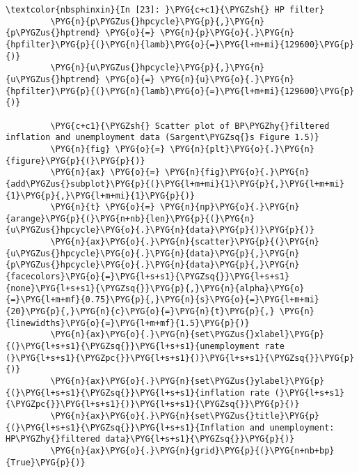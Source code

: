 \documentclass[letterpaper,10pt,openany,oneside,english]{sphinxmanual}
\begin{document}
\noindent{}

%
\begin{Verbatim}[commandchars=\\\{\}]
\textcolor{nbsphinxin}{In [23]: }\PYG{c+c1}{\PYGZsh{} HP filter}
         \PYG{n}{p\PYGZus{}hpcycle}\PYG{p}{,}\PYG{n}{p\PYGZus{}hptrend} \PYG{o}{=} \PYG{n}{p}\PYG{o}{.}\PYG{n}{hpfilter}\PYG{p}{(}\PYG{n}{lamb}\PYG{o}{=}\PYG{l+m+mi}{129600}\PYG{p}{)}
         \PYG{n}{u\PYGZus{}hpcycle}\PYG{p}{,}\PYG{n}{u\PYGZus{}hptrend} \PYG{o}{=} \PYG{n}{u}\PYG{o}{.}\PYG{n}{hpfilter}\PYG{p}{(}\PYG{n}{lamb}\PYG{o}{=}\PYG{l+m+mi}{129600}\PYG{p}{)}
         
         \PYG{c+c1}{\PYGZsh{} Scatter plot of BP\PYGZhy{}filtered inflation and unemployment data (Sargent\PYGZsq{}s Figure 1.5)}
         \PYG{n}{fig} \PYG{o}{=} \PYG{n}{plt}\PYG{o}{.}\PYG{n}{figure}\PYG{p}{(}\PYG{p}{)}
         \PYG{n}{ax} \PYG{o}{=} \PYG{n}{fig}\PYG{o}{.}\PYG{n}{add\PYGZus{}subplot}\PYG{p}{(}\PYG{l+m+mi}{1}\PYG{p}{,}\PYG{l+m+mi}{1}\PYG{p}{,}\PYG{l+m+mi}{1}\PYG{p}{)}
         \PYG{n}{t} \PYG{o}{=} \PYG{n}{np}\PYG{o}{.}\PYG{n}{arange}\PYG{p}{(}\PYG{n+nb}{len}\PYG{p}{(}\PYG{n}{u\PYGZus{}hpcycle}\PYG{o}{.}\PYG{n}{data}\PYG{p}{)}\PYG{p}{)}
         \PYG{n}{ax}\PYG{o}{.}\PYG{n}{scatter}\PYG{p}{(}\PYG{n}{u\PYGZus{}hpcycle}\PYG{o}{.}\PYG{n}{data}\PYG{p}{,}\PYG{n}{p\PYGZus{}hpcycle}\PYG{o}{.}\PYG{n}{data}\PYG{p}{,}\PYG{n}{facecolors}\PYG{o}{=}\PYG{l+s+s1}{\PYGZsq{}}\PYG{l+s+s1}{none}\PYG{l+s+s1}{\PYGZsq{}}\PYG{p}{,}\PYG{n}{alpha}\PYG{o}{=}\PYG{l+m+mf}{0.75}\PYG{p}{,}\PYG{n}{s}\PYG{o}{=}\PYG{l+m+mi}{20}\PYG{p}{,}\PYG{n}{c}\PYG{o}{=}\PYG{n}{t}\PYG{p}{,} \PYG{n}{linewidths}\PYG{o}{=}\PYG{l+m+mf}{1.5}\PYG{p}{)}
         \PYG{n}{ax}\PYG{o}{.}\PYG{n}{set\PYGZus{}xlabel}\PYG{p}{(}\PYG{l+s+s1}{\PYGZsq{}}\PYG{l+s+s1}{unemployment rate (}\PYG{l+s+s1}{\PYGZpc{}}\PYG{l+s+s1}{)}\PYG{l+s+s1}{\PYGZsq{}}\PYG{p}{)}
         \PYG{n}{ax}\PYG{o}{.}\PYG{n}{set\PYGZus{}ylabel}\PYG{p}{(}\PYG{l+s+s1}{\PYGZsq{}}\PYG{l+s+s1}{inflation rate (}\PYG{l+s+s1}{\PYGZpc{}}\PYG{l+s+s1}{)}\PYG{l+s+s1}{\PYGZsq{}}\PYG{p}{)}
         \PYG{n}{ax}\PYG{o}{.}\PYG{n}{set\PYGZus{}title}\PYG{p}{(}\PYG{l+s+s1}{\PYGZsq{}}\PYG{l+s+s1}{Inflation and unemployment: HP\PYGZhy{}filtered data}\PYG{l+s+s1}{\PYGZsq{}}\PYG{p}{)}
         \PYG{n}{ax}\PYG{o}{.}\PYG{n}{grid}\PYG{p}{(}\PYG{n+nb+bp}{True}\PYG{p}{)}
\end{Verbatim}

\noindent{}
\end{document}
